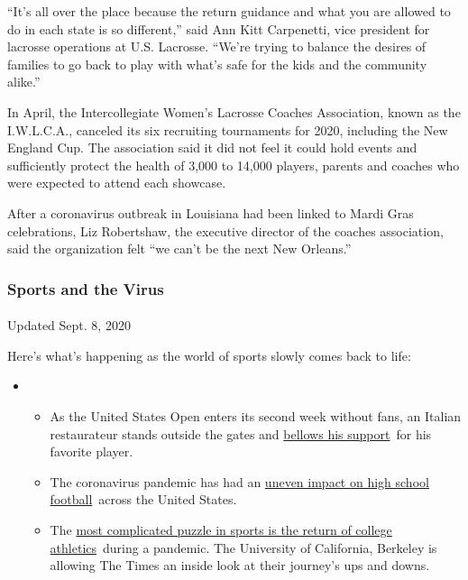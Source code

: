``It's all over the place because the return guidance and what you are
allowed to do in each state is so different,'' said Ann Kitt Carpenetti,
vice president for lacrosse operations at U.S. Lacrosse. ``We're trying
to balance the desires of families to go back to play with what's safe
for the kids and the community alike.''

In April, the Intercollegiate Women's Lacrosse Coaches Association,
known as the I.W.L.C.A., canceled its six recruiting tournaments for
2020, including the New England Cup. The association said it did not
feel it could hold events and sufficiently protect the health of 3,000
to 14,000 players, parents and coaches who were expected to attend each
showcase.

After a coronavirus outbreak in Louisiana had been linked to Mardi Gras
celebrations, Liz Robertshaw, the executive director of the coaches
association, said the organization felt ``we can't be the next New
Orleans.''

\hypertarget{sports-and-the-virus}{%
\subsubsection{Sports and the Virus}\label{sports-and-the-virus}}

\paragraph{}

Updated Sept. 8, 2020

Here's what's happening as the world of sports slowly comes back to
life:

\begin{itemize}
\item
  \begin{itemize}
  \tightlist
  \item
    As the United States Open enters its second week without fans, an
    Italian restaurateur stands outside the gates and
    \href{https://www.nytimes3xbfgragh.onion/2020/09/06/sports/tennis/US-Open-Matteo-Berrettini-fan.html?action=click\&pgtype=Article\&state=default\&region=MAIN_CONTENT_2\&context=storylines_keepup}{bellows
    his support}~for his favorite player.
  \item
    The coronavirus pandemic has had an
    \href{https://www.nytimes3xbfgragh.onion/2020/09/03/sports/ncaafootball/high-school-football-coronavirus-pandemic.html?action=click\&pgtype=Article\&state=default\&region=MAIN_CONTENT_2\&context=storylines_keepup}{uneven
    impact on high school football}~across the United States.
  \item
    The
    \href{https://www.nytimes3xbfgragh.onion/2020/09/02/sports/ncaafootball/coronavirus-cal-athletics-season.html?action=click\&pgtype=Article\&state=default\&region=MAIN_CONTENT_2\&context=storylines_keepup}{most
    complicated puzzle in sports is the return of college
    athletics}~during a pandemic. The University of California, Berkeley
    is allowing The Times an inside look at their journey's ups and
    downs.
  \end{itemize}
\end{itemize}

